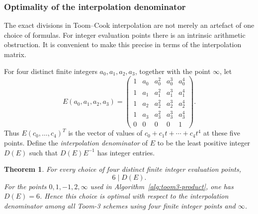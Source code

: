 \documentclass[11pt]{book}
\newtheorem{theorem}{Theorem}[section]
\theoremstyle{definition}
\begin{document}
\subsubsection{Optimality of the interpolation denominator}

The exact divisions in Toom--Cook interpolation are not merely an artefact of
one choice of formulas.  For integer evaluation points there is an intrinsic
arithmetic obstruction.  It is convenient to make this precise in terms of the
interpolation matrix.

For four distinct finite integers $a_0,a_1,a_2,a_3$, together with the point
$\infty$, let
\[
 E(a_0,a_1,a_2,a_3)=
 \begin{pmatrix}
  1&a_0&a_0^2&a_0^3&a_0^4\\
  1&a_1&a_1^2&a_1^3&a_1^4\\
  1&a_2&a_2^2&a_2^3&a_2^4\\
  1&a_3&a_3^2&a_3^3&a_3^4\\
  0&0&0&0&1
 \end{pmatrix}.
\]
Thus $E(c_0,\ldots,c_4)^T$ is the vector of values of
$c_0+c_1t+\cdots+c_4t^4$ at these five points.  Define the
\emph{interpolation denominator} of $E$ to be the least positive integer
$D(E)$ such that $D(E)E^{-1}$ has integer entries.

\begin{theorem}\label{thm:toom3-denominator-lower-bound}
For every choice of four distinct finite integer evaluation points,
\[
 6\mid D(E).
\]
For the points $0,1,-1,2,\infty$ used in
Algorithm~\ref{alg:toom3-product}, one has $D(E)=6$.  Hence this choice is
optimal with respect to the interpolation denominator among all Toom-3
schemes using four finite integer points and $\infty$.
\end{theorem}
\end{document}

